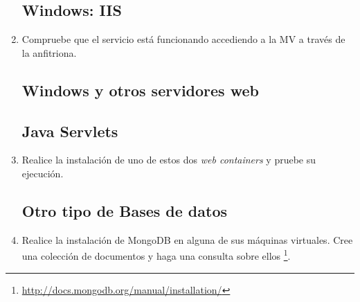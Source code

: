 \documentclass[paper=a4, fontsize=11pt]{scrartcl} %
\numberwithin{equation}{section} %
\numberwithin{figure}{section} %
\numberwithin{table}{section} %
\begin{document}
\begin{enumerate}
	
	\subsection{Windows: IIS}
	\item Compruebe que el servicio está funcionando accediendo a la MV a través de la anfitriona.
	\subsection{Windows y otros servidores web}
	\subsection{Java Servlets}
	\item Realice la instalación de uno de estos dos \textit{web containers} y pruebe su ejecución.
	
	\subsection{Otro tipo de Bases de datos}
	\item Realice la instalación de MongoDB en alguna de sus máquinas virtuales. Cree una colección de
	documentos y haga una consulta sobre ellos \footnote{\url{http://docs.mongodb.org/manual/installation/}}.
	

\end{enumerate}
\end{document}
